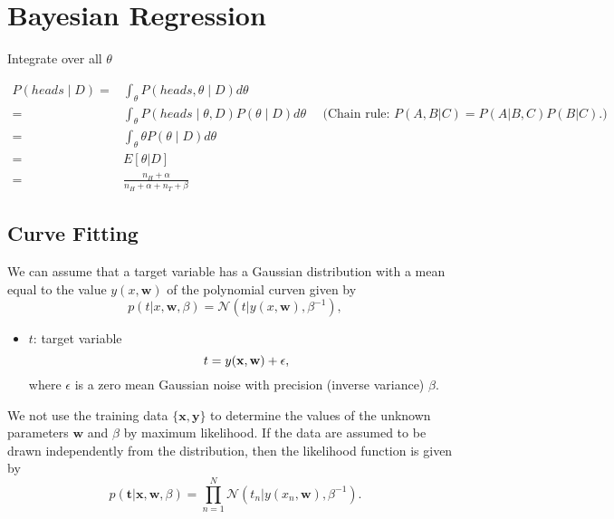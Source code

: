 \chapter{Bayesian Regression}

Integrate over all $\theta$

\begin{align}
P(heads \mid D) =& \int_{\theta} P(heads, \theta \mid D) d\theta\\
 =& \int_{\theta} P(heads \mid \theta, D) P(\theta \mid D) d\theta \ \ \ \ \ \  \textrm{(Chain rule: $P(A,B|C)=P(A|B,C)P(B|C)$.)}\\ 
  =& \int_{\theta} \theta P(\theta \mid D) d\theta\\ 
  =&E\left[\theta|D\right]\\
 =&\frac{n_H + \alpha}{n_H + \alpha + n_T + \beta}
\end{align}


\section{Curve Fitting}
We can assume that a target variable has a Gaussian distribution with a mean equal to the value $y(x,\mathbf{w})$ of the polynomial curven given by
\begin{equation}
	p(t|x, \mathbf{w}, \beta) = \mathcal{N}(t|y(x,\mathbf{w}), \beta^{-1}),
	\label{eq:curve}
\end{equation}
\begin{itemize}
	\item $t$: target variable
		$$t = y({\mathbf{x}}, {\mathbf{w}}) +\epsilon,$$
	where $\epsilon$ is a zero mean Gaussian noise with precision (inverse variance) $\beta$. 
\end{itemize}

We not use the training data $\{\mathbf{x,y}\}$ to determine the values of the unknown parameters $\mathbf{w}$ and $\beta$ by maximum likelihood. If the data are assumed to be drawn independently from the distribution, then the likelihood function is given by 
\begin{equation}
	p(\mathbf{t}|\mathbf{x,w},\beta) = \prod_{n=1}^{N}\mathcal{N}(t_n|y(x_n,\mathbf{w}), \beta^{-1}).
	\label{eq:curve_ml}
\end{equation}

